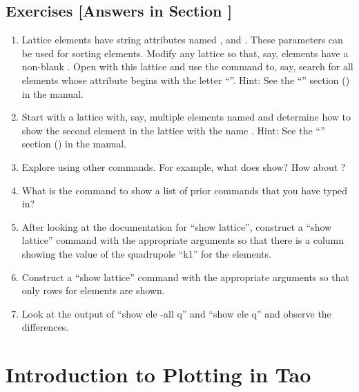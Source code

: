 \documentclass{hitec}     %
\newcommand{\Section}[1]{\section{#1}\vspace*{-1ex}}
\begin{document}
\subsection{Exercises [Answers in Section ]}
\label{s:show.ex}

\begin{enumerate}[label=\thesection.\arabic{enumi}]
\item
Lattice elements have string attributes named ,  and . These
parameters can be used for sorting elements. Modify any lattice so that, say, elements have a
non-blank . Open \tao with this lattice and use the  command to, say,
search for all elements whose  attribute begins with the letter ``''. Hint: See
the ``''
section () in the \bmad manual.
%
\item
Start \tao with a lattice with, say, multiple elements named  and determine how to show the
second element in the lattice with the name . Hint: See the ``'' section () in the \bmad manual.
%
\item 
Explore using other  commands. For example, what does  show? How about
?
%
\item 
What is the command to show a list of prior commands that you have typed in?
%
\item
After looking at the documentation for ``show lattice'', construct a ``show lattice'' command with
the appropriate arguments so that there is a column showing the value of the quadrupole ``k1'' for
the elements.
%
\item
Construct a ``show lattice'' command with the appropriate arguments so that only rows for 
elements are shown.
%
\item
Look at the output of ``show ele -all q'' and ``show ele q'' and observe the differences.

\end{enumerate}

\newpage

\Section{Introduction to Plotting in Tao}
\label{s:plotting}
\end{document}
